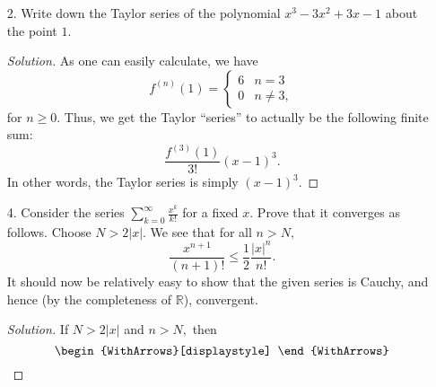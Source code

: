 \documentclass[12pt]{article}
\newcommand{\md}[1]{\left\lvert #1 \right\lvert}
\theoremstyle{definition}
\newenvironment{soln}{\begin{proof}[Solution]}{\end{proof}}
\begin{document}
\begin{itemize}
\begin{soln}
		Once again, note that
		\begin{equation*} 
			g(t) = 1 - t^2 + t^4 - \cdots.
		\end{equation*}
		For $n \ge 1,$ we note that
		\begin{align*} 
			g(t) &= [1 - t^2 + \cdots + (-1)^nt^{2n}] + {\color{red}(-1)^{n+1}t^{2n + 2}[1 - t^2 + \cdots]}\\
			&= [1 - t^2 + \cdots + (-1)^nt^{2n}] + {\color{red}(-1)^{n+1}\dfrac{t^{2n + 2}}{1 + t^2}}
		\end{align*}
		Integrating both sides from $0$ to $x$ gives
		\begin{equation*} 
			f(x) = P_{2n + 1}(x) + {\color{red}(-1)^{n+1}\int_{0}^{x} \dfrac{t^{2n + 2}}{1 + t^2} {\mathrm{d}}t}.
		\end{equation*}
		Thus, the term in red is the $(2n + 1)$-th remainder $R_{2n + 1}(x).$ Conclude as before, for $R_{2n}(x).$
	\end{soln}
	\newpage
	\item[2.]  Write down the Taylor series of the polynomial $x^3 - 3x^2 + 3x - 1$ about the point $1.$
	\begin{soln}
		As one can easily calculate, we have
		\begin{equation*} 
			f^{(n)}(1) = \begin{cases}
				6 & n = 3\\
				0 & n \neq 3,
			\end{cases}
		\end{equation*}
		for $n \ge 0.$ Thus, we get the Taylor ``series'' to actually be the following finite sum:
		\begin{equation*} 
			\dfrac{f^{(3)}(1)}{3!}(x - 1)^3.
		\end{equation*}
		In other words, the Taylor series is simply $(x - 1)^3.$
	\end{soln}
	\newpage
	\item[4.] Consider the series $\sum_{k = 0}^{\infty}\frac{x^k}{k!}$ for a fixed $x.$ Prove that it converges as follows. Choose $N > 2\md{x}.$ We see that for all $n > N,$
	\begin{equation*} 
		\dfrac{x^{n + 1}}{(n + 1)!} \le \dfrac{1}{2}\dfrac{\md{x}^n}{n!}.
	\end{equation*}
	It should now be relatively easy to show that the given series is Cauchy, and hence (by the completeness of $\mathbb{R}$), convergent.
	\begin{soln}
		If $N > 2\md{x}$ and $n > N,$ then
		\[\begin{WithArrows}[displaystyle]

\end{WithArrows}\]
\end{soln}
\end{itemize}
\end{document}
